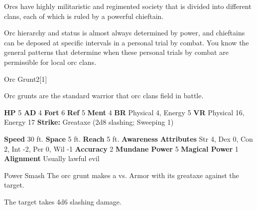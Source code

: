       Orcs have highly militaristic and regimented society that is divided into different clans, each of which is ruled by a powerful chieftain.
    
      Orc hierarchy and status is almost always determined by power, and chieftains can be deposed at specific intervals in a personal trial by combat.
      You know the general patterns that determine when these personal trials by combat are permissible for local orc clans.
    

      
  \begin{monsubsection}{Orc Grunt}{2}[1]
    \vspace{-1em}\vspace{-1em}
    \vspace{0em}

    
          Orc grunts are the standard warrior that orc clans field in battle.
        

    \begin{spellcontent}
      \begin{spelltargetinginfo}
        \pari \textbf{HP} 5 \monsep
          \textbf{AD} 4 \monsep
          \textbf{Fort} 6 \monsep
          \textbf{Ref} 5 \monsep
          \textbf{Ment} 4
        \pari \textbf{BR} Physical 4, Energy 5 \monsep
        \textbf{VR} Physical 16, Energy 17
        \pari \textbf{Strike:}
            Greataxe  (2d8 slashing; Sweeping 1)
      \end{spelltargetinginfo}
    \end{spellcontent}
    \begin{monsterfooter}
      \pari \textbf{Speed} 30 ft. \monsep
        \textbf{Space} 5 ft. \monsep
        \textbf{Reach} 5 ft.
      \pari \textbf{Awareness} 
      \pari \textbf{Attributes}
        Str 4, Dex 0,
        Con 2, Int -2,
        Per 0, Wil -1
      \pari \textbf{Accuracy} 2 \monsep
        \textbf{Mundane Power} 5 \monsep
      \textbf{Magical Power} 1
      \pari \textbf{Alignment} Usually lawful evil
    \end{monsterfooter}
  \end{monsubsection}
  \begin{freeability}{Power Smash}
       The orc grunt makes a 
         vs. Armor
        with its greataxe against the target.
    
    \hit The target takes 4d6 slashing damage.
    \end{freeability}
  

